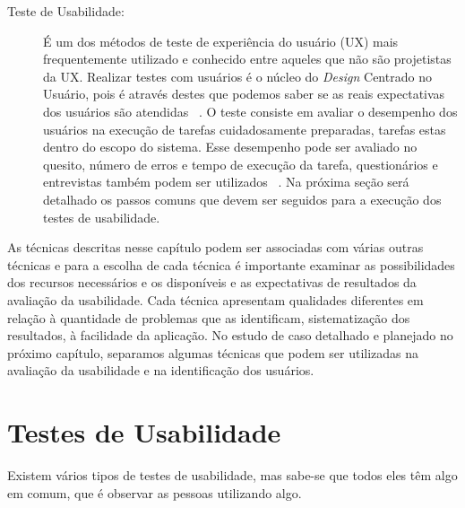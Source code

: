 \begin{description}
\item[Teste de Usabilidade:]

É um dos métodos de teste de experiência do usuário (UX) mais frequentemente utilizado e conhecido entre aqueles que não são projetistas da UX. Realizar testes com usuários é o núcleo do \emph{Design} Centrado no Usuário, pois é através destes que podemos saber se as reais expectativas dos usuários são atendidas ~\cite{santos2012}.
%
O teste consiste em avaliar o desempenho dos usuários na execução de tarefas cuidadosamente preparadas, tarefas estas dentro do escopo do sistema. Esse desempenho pode ser avaliado no quesito, número de erros e tempo de execução da tarefa, questionários e entrevistas também podem ser utilizados ~\cite{preece2007}. Na próxima seção será detalhado os passos comuns que devem ser seguidos para a execução dos testes de usabilidade.

\end{description}

	As técnicas descritas nesse capítulo podem ser associadas com várias outras técnicas e para a escolha de cada técnica é importante examinar as possibilidades dos recursos necessários e os disponíveis e as expectativas de resultados da avaliação da usabilidade. Cada técnica apresentam qualidades diferentes em relação à quantidade de problemas que as identificam, sistematização dos resultados, à facilidade da aplicação. 
%
No estudo de caso detalhado e planejado no próximo capítulo, separamos algumas técnicas que podem ser utilizadas na avaliação da usabilidade e na identificação dos usuários. 

\section{Testes de Usabilidade}

	Existem vários tipos de testes de usabilidade, mas sabe-se que todos eles têm algo em comum, que é observar as pessoas utilizando algo.

